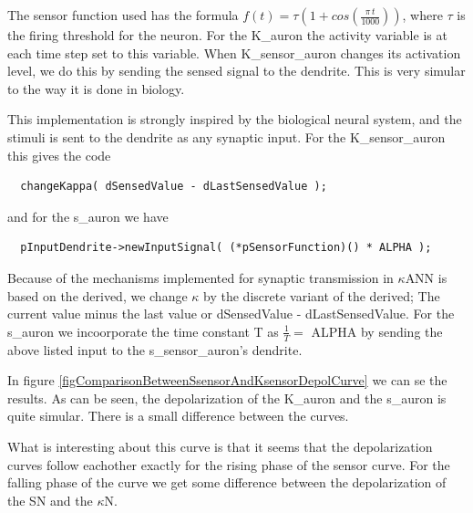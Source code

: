 The sensor function used has the formula $f(t) = \tau (1 + cos( \frac{\pi \, t}{1000} ))$, where $\tau$ is the firing threshold for the neuron. 
For the K\_auron the activity variable is at each time step set to this variable. 
When K\_sensor\_auron changes its activation level, we do this by sending the sensed signal to the dendrite. 
This is very simular to the way it is done in biology. %

This implementation is strongly inspired by the biological neural system, and the stimuli is sent to the dendrite as any synaptic input.
For the K\_sensor\_auron this gives the code
\begin{lstlisting}
  changeKappa( dSensedValue - dLastSensedValue ); 
\end{lstlisting} %
and for the s\_auron we have
\begin{lstlisting}
  pInputDendrite->newInputSignal( (*pSensorFunction)() * ALPHA ); 
\end{lstlisting} %


Because of the mechanisms implemented for synaptic transmission in $\kappa$ANN is based on the derived, we change $\kappa$ by the discrete variant of the derived; 
The current value minus the last value or dSensedValue - dLastSensedValue.
For the s\_auron we incoorporate the time constant T as $\frac{1}{T} = $ ALPHA by sending the above listed input to the s\_sensor\_auron's dendrite.


In figure \ref{figComparisonBetweenSsensorAndKsensorDepolCurve} we can se the results. 
As can be seen, the depolarization of the K\_auron and the s\_auron is quite simular.
There is a small difference between the curves.

What is interesting about this curve is that it seems that the depolarization curves follow eachother exactly %
for the rising phase of the sensor curve. For the falling phase of the curve we get some difference between the depolarization of the SN and the $\kappa$N.

